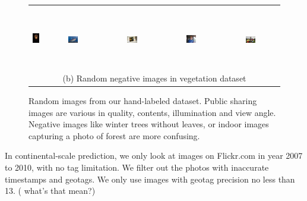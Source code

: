 \begin{figure}[th]
{{\begin{center}
\begin{tabular}{@{}c@{\,\,\,}c@{\,\,\,}c@{\,\,\,}c@{\,\,\,}c@{\,\,\,}}
\\[-6pt]
\hline
\\[-6pt]
\includegraphics[height=1in]{imggrid/datasetnega/6.jpg} &
\includegraphics[width=0.19\textwidth]{imggrid/datasetnega/7.jpg} &
\includegraphics[width=0.19\textwidth]{imggrid/datasetnega/8.jpg} &
\includegraphics[width=0.19\textwidth]{imggrid/datasetnega/9.jpg} &
\includegraphics[width=0.19\textwidth]{imggrid/datasetnega/10.jpg} \\
\multicolumn{5}{c}{(b) Random negative images in vegetation dataset} \\
\end{tabular}
\end{center}
}}
\caption{Random images from our hand-labeled dataset. Public sharing images are various in quality, contents, illumination and view angle.
Negative images like winter trees without leaves, or indoor images capturing a photo of forest are more confusing.}
\label{fig:dataset}
\end{figure}


In continental-scale prediction, we only look at images on Flickr.com in year 2007 to 2010, with no tag limitation. We filter out the photos with inaccurate timestamps and geotags. We only use images with geotag precision no less than 13. ( what's that mean?) 

